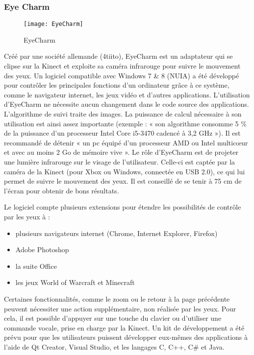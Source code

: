 \subsubsection{Eye Charm}

\begin{figure}[h]
  \centering
  \texttt{[image: EyeCharm]}
  \caption{EyeCharm}
  \label{fig:EyeCharm}
\end{figure}

Créé par une société allemande (4tiito), EyeCharm \cite{eyecharm} est un adaptateur qui se clipse sur la Kinect et exploite sa caméra infrarouge pour suivre le mouvement des yeux. Un logiciel compatible avec Windows 7 \& 8 (NUIA) a été développé pour contrôler les principales fonctions d’un ordinateur grâce à ce système, comme le navigateur internet, les jeux vidéo et d’autres applications. L’utilisation d’EyeCharm ne nécessite aucun changement dans le code source des applications.
L’algorithme de suivi traite des images. La puissance de calcul nécessaire à son utilisation est ainsi assez importante (exemple : « son algorithme consomme 5 \% de la puissance d’un processeur Intel Core i5-3470 cadencé à 3,2 GHz »). Il est recommandé de détenir « un pc équipé d’un processeur AMD ou Intel multicœur et avec au moins 2 Go de mémoire vive ».
Le rôle d’EyeCharm est de projeter une lumière infrarouge sur le visage de l’utilisateur. Celle-ci est captée par la caméra de la Kinect (pour Xbox ou Windows, connectée en USB 2.0), ce qui lui permet de suivre le mouvement des yeux. Il est conseillé de se tenir à 75 cm de l’écran pour obtenir de bons résultats.

Le logiciel compte plusieurs extensions pour étendre les possibilités de contrôle par les yeux à :
\begin{itemize}[label=\textbullet,font=\color{black}]
\item plusieurs navigateurs internet (Chrome, Internet Explorer, Firefox)
\item Adobe Photoshop
\item la suite Office
\item les jeux World of Warcraft et Minecraft
\end{itemize}

Certaines fonctionnalités, comme le zoom ou le retour à la page précédente peuvent nécessiter une action supplémentaire, non réalisée par les yeux. Pour cela, il est possible d’appuyer sur une touche du clavier ou d’utiliser une commande vocale, prise en charge par la Kinect. 
Un kit de développement a été prévu pour que les utilisateurs puissent développer eux-mêmes des applications à l’aide de Qt Creator, Visual Studio, et les langages C, C++, C\# et Java.

